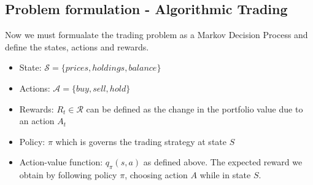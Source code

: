 \documentclass[12pt]{article}
\begin{document}
\subsection{Problem formulation - Algorithmic Trading}
Now we must formualate the trading problem as a Markov Decision Process and define the states, actions and rewards.

\begin{itemize}
	\item State: $\mathcal{S} = \{prices,holdings,balance\} $
	\item Actions: $\mathcal{A} = \{buy,sell,hold\}$
	\item Rewards: $R_{t} \in \mathcal{R}$ can be defined as the change in the portfolio value due to an action $A_{t}$
	\item Policy: $\pi$ which is governs the trading strategy at state $S$
	\item Action-value function: $q_{\pi}(s,a)$ as defined above. The expected reward we obtain by following policy $\pi$, choosing action $A$ while in state $S$.
\end{itemize}
\end{document}

